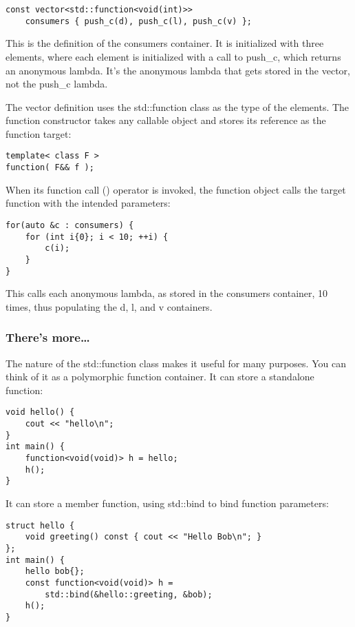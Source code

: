 \begin{lstlisting}[style=styleCXX]
const vector<std::function<void(int)>>
	consumers { push_c(d), push_c(l), push_c(v) };
\end{lstlisting}

This is the definition of the consumers container. It is initialized with three elements, where each element is initialized with a call to push\_c, which returns an anonymous lambda. It's the anonymous lambda that gets stored in the vector, not the push\_c lambda.

The vector definition uses the std::function class as the type of the elements. The function constructor takes any callable object and stores its reference as the function target:

\begin{lstlisting}[style=styleCXX]
template< class F >
function( F&& f );
\end{lstlisting}

When its function call () operator is invoked, the function object calls the target function with the intended parameters:

\begin{lstlisting}[style=styleCXX]
for(auto &c : consumers) {
	for (int i{0}; i < 10; ++i) {
		c(i);
	}
}
\end{lstlisting}

This calls each anonymous lambda, as stored in the consumers container, 10 times, thus populating the d, l, and v containers.

\subsubsection{There's more…}

The nature of the std::function class makes it useful for many purposes. You can think of it as a polymorphic function container. It can store a standalone function:

\begin{lstlisting}[style=styleCXX]
void hello() {
	cout << "hello\n";
}
int main() {
	function<void(void)> h = hello;
	h();
}
\end{lstlisting}

It can store a member function, using std::bind to bind function parameters:

\begin{lstlisting}[style=styleCXX]
struct hello {
	void greeting() const { cout << "Hello Bob\n"; }
};
int main() {
	hello bob{};
	const function<void(void)> h =
		std::bind(&hello::greeting, &bob);
	h();
}
\end{lstlisting}

